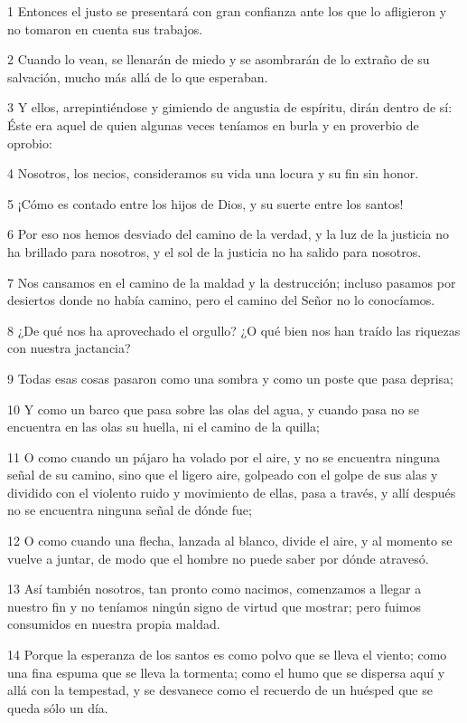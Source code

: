 \par 1 Entonces el justo se presentará con gran confianza ante los que lo afligieron y no tomaron en cuenta sus trabajos.
\par 2 Cuando lo vean, se llenarán de miedo y se asombrarán de lo extraño de su salvación, mucho más allá de lo que esperaban.
\par 3 Y ellos, arrepintiéndose y gimiendo de angustia de espíritu, dirán dentro de sí: Éste era aquel de quien algunas veces teníamos en burla y en proverbio de oprobio:
\par 4 Nosotros, los necios, consideramos su vida una locura y su fin sin honor.
\par 5 ¡Cómo es contado entre los hijos de Dios, y su suerte entre los santos!
\par 6 Por eso nos hemos desviado del camino de la verdad, y la luz de la justicia no ha brillado para nosotros, y el sol de la justicia no ha salido para nosotros.
\par 7 Nos cansamos en el camino de la maldad y la destrucción; incluso pasamos por desiertos donde no había camino, pero el camino del Señor no lo conocíamos.
\par 8 ¿De qué nos ha aprovechado el orgullo? ¿O qué bien nos han traído las riquezas con nuestra jactancia?
\par 9 Todas esas cosas pasaron como una sombra y como un poste que pasa deprisa;
\par 10 Y como un barco que pasa sobre las olas del agua, y cuando pasa no se encuentra en las olas su huella, ni el camino de la quilla;
\par 11 O como cuando un pájaro ha volado por el aire, y no se encuentra ninguna señal de su camino, sino que el ligero aire, golpeado con el golpe de sus alas y dividido con el violento ruido y movimiento de ellas, pasa a través, y allí después no se encuentra ninguna señal de dónde fue;
\par 12 O como cuando una flecha, lanzada al blanco, divide el aire, y al momento se vuelve a juntar, de modo que el hombre no puede saber por dónde atravesó.
\par 13 Así también nosotros, tan pronto como nacimos, comenzamos a llegar a nuestro fin y no teníamos ningún signo de virtud que mostrar; pero fuimos consumidos en nuestra propia maldad.
\par 14 Porque la esperanza de los santos es como polvo que se lleva el viento; como una fina espuma que se lleva la tormenta; como el humo que se dispersa aquí y allá con la tempestad, y se desvanece como el recuerdo de un huésped que se queda sólo un día.
